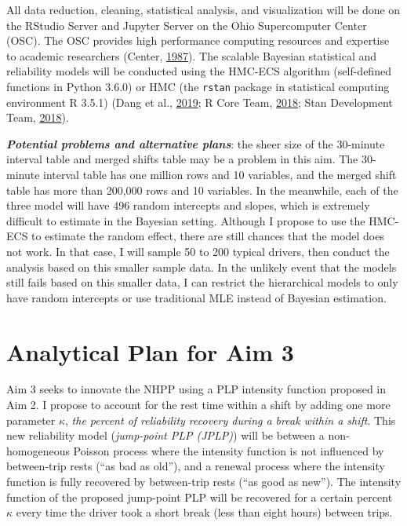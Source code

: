 \documentclass[12pt]{book}
\numberwithin{equation}{chapter}
\begin{document}
All data reduction, cleaning, statistical analysis, and visualization will be done on the RStudio Server and Jupyter Server on the Ohio Supercomputer Center (OSC). The OSC provides high performance computing resources and expertise to academic researchers (Center, \protect\hyperlink{ref-OSC1987}{1987}). The scalable Bayesian statistical and reliability models will be conducted using the HMC-ECS algorithm (self-defined functions in Python 3.6.0) or HMC (the \texttt{rstan} package in statistical computing environment R 3.5.1) (Dang et al., \protect\hyperlink{ref-dang2019hamiltonian}{2019}; R Core Team, \protect\hyperlink{ref-Rcitation}{2018}; Stan Development Team, \protect\hyperlink{ref-rstancitation}{2018}).

\textbf{\emph{Potential problems and alternative plans}}: the sheer size of the 30-minute interval table and merged shifts table may be a problem in this aim. The 30-minute interval table has one million rows and 10 variables, and the merged shift table has more than 200,000 rows and 10 variables. In the meanwhile, each of the three model will have 496 random intercepts and slopes, which is extremely difficult to estimate in the Bayesian setting. Although I propose to use the HMC-ECS to estimate the random effect, there are still chances that the model does not work. In that case, I will sample 50 to 200 typical drivers, then conduct the analysis based on this smaller sample data. In the unlikely event that the models still fails based on this smaller data, I can restrict the hierarchical models to only have random intercepts or use traditional MLE instead of Bayesian estimation.

\hypertarget{analytical-plan-for-aim-3}{%
\section{Analytical Plan for Aim 3}\label{analytical-plan-for-aim-3}}

Aim 3 seeks to innovate the NHPP using a PLP intensity function proposed in Aim 2. I propose to account for the rest time within a shift by adding one more parameter \(\kappa\), \emph{the percent of reliability recovery during a break within a shift}. This new reliability model (\emph{jump-point PLP (JPLP)}) will be between a non-homogeneous Poisson process where the intensity function is not influenced by between-trip rests (``as bad as old''), and a renewal process where the intensity function is fully recovered by between-trip rests (``as good as new''). The intensity function of the proposed jump-point PLP will be recovered for a certain percent \(\kappa\) every time the driver took a short break (less than eight hours) between trips.
\end{document}
